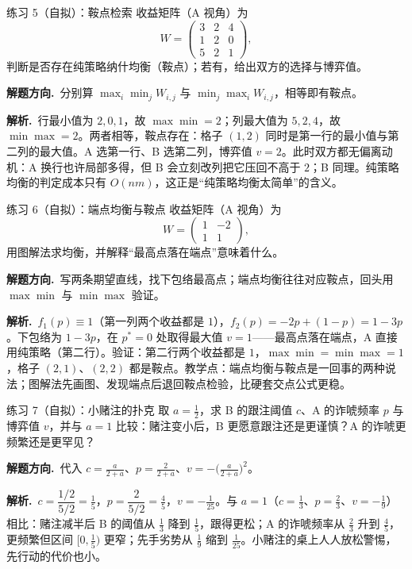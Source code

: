 \documentclass[UTF8,a4paper,11pt,oneside,openany,fontset=fandol]{ctexbook}
\theoremstyle{definition}
\newcommand{\sol}{\par\noindent\textbf{解析.}\ }
\newcommand{\hint}{\par\noindent\textbf{解题方向.}\ }
\begin{document}
\begin{problem}{练习 5（自拟）：鞍点检索}
收益矩阵（A 视角）为
\[
 W=\begin{pmatrix}3&2&4\\1&2&0\\5&2&1\end{pmatrix},
\]
判断是否存在纯策略纳什均衡（鞍点）；若有，给出双方的选择与博弈值。
\end{problem}

\hint 分别算 $\max_i\min_j W_{i,j}$ 与 $\min_j\max_i W_{i,j}$，相等即有鞍点。

\sol 行最小值为 $2,0,1$，故 $\max\min=2$；列最大值为 $5,2,4$，故 $\min\max=2$。两者相等，鞍点存在：格子 $(1,2)$ 同时是第一行的最小值与第二列的最大值。A 选第一行、B 选第二列，博弈值 $v=2$。此时双方都无偏离动机：A 换行也许局部多得，但 B 会立刻改列把它压回不高于 $2$；B 同理。纯策略均衡的判定成本只有 $O(nm)$，这正是“纯策略均衡太简单”的含义。

\begin{problem}{练习 6（自拟）：端点均衡与鞍点}
收益矩阵（A 视角）为
\[
 W=\begin{pmatrix}1&-2\\1&1\end{pmatrix},
\]
用图解法求均衡，并解释“最高点落在端点”意味着什么。
\end{problem}

\hint 写两条期望直线，找下包络最高点；端点均衡往往对应鞍点，回头用 $\max\min$ 与 $\min\max$ 验证。

\sol $f_1(p)\equiv1$（第一列两个收益都是 $1$），$f_2(p)=-2p+(1-p)=1-3p$。下包络为 $1-3p$，在 $p^{*}=0$ 处取得最大值 $v=1$——最高点落在端点，A 直接用纯策略（第二行）。验证：第二行两个收益都是 $1$，$\max\min=\min\max=1$，格子 $(2,1)$、$(2,2)$ 都是鞍点。教学点：端点均衡与鞍点是一回事的两种说法；图解法先画图、发现端点后退回鞍点检验，比硬套交点公式更稳。

\begin{problem}{练习 7（自拟）：小赌注的扑克}
取 $a=\tfrac12$，求 B 的跟注阈值 $c$、A 的诈唬频率 $p$ 与博弈值 $v$，并与 $a=1$ 比较：赌注变小后，B 更愿意跟注还是更谨慎？A 的诈唬更频繁还是更罕见？
\end{problem}

\hint 代入 $c=\tfrac{a}{2+a}$、$p=\tfrac{2}{2+a}$、$v=-\bigl(\tfrac{a}{2+a}\bigr)^{2}$。

\sol $c=\dfrac{1/2}{5/2}=\tfrac15$，$p=\dfrac{2}{5/2}=\tfrac45$，$v=-\tfrac1{25}$。与 $a=1$（$c=\tfrac13$、$p=\tfrac23$、$v=-\tfrac19$）相比：赌注减半后 B 的阈值从 $\tfrac13$ 降到 $\tfrac15$，跟得更松；A 的诈唬频率从 $\tfrac23$ 升到 $\tfrac45$，更频繁但区间 $[0,\tfrac15)$ 更窄；先手劣势从 $\tfrac19$ 缩到 $\tfrac1{25}$。小赌注的桌上人人放松警惕，先行动的代价也小。
\end{document}
